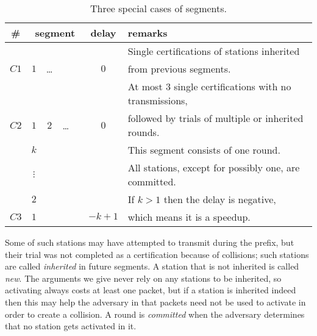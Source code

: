 \documentclass[11pt]{article}
\newcommand{\FF}{\vspace*{\medskipamount}}
\newlength{\pagewidth}
\newcommand{\RB}{\raisebox{2.5ex}{~}}
\newcommand{\LB}{\raisebox{-1.5ex}{~}}
\begin{document}
\begin{table}[tp]
\begin{center}
\begin{tabular}{|c| c  c  c  c | c | l |}
\hline
\RB \LB
 \# & \multicolumn{4}{|c|}{ segment}   & delay & remarks \\
\hline
\hline


\RB \LB
 &  &  &  &  & & 
Single certifications of  stations inherited\\
\LB
$C1$ &\underline{$1$} & \ldots & &   & $0$ & 
from previous segments.\\
\hline

\RB \LB
 &  &  &  & &&   
At most $3$ single certifications with no transmissions, \\
\LB
$C2$ &$1$ & $2$ & \ldots &   & $0$ & 
followed by trials of multiple or inherited rounds.\\
\hline


\RB \LB
 & $k$  & & & &  &   
This segment consists of one round.\\
\RB \LB
 & $\vdots$  & & & &  &   
All stations, except for possibly one, are committed.\\
\RB \LB
 & $2$  & & & &  &   
If $k>1$ then the delay is negative,\\
\RB \LB
$C3$ & \underline{$1$}   & & &  & $-k+1$ & 
which means it is a speedup. \\
\hline

\end{tabular}
\parbox{\pagewidth}{\FF\caption{\label{table-a} 
Three special cases of segments. 
}}
\end{center}
\end{table}



Some of such stations may have attempted to transmit during the prefix, but their trial was not completed as a certification because of collisions; such stations are called \emph{inherited} in future segments.
A station that is not inherited is called \emph{new}.
The arguments we give never rely on any stations to be inherited, so activating always costs at least one packet, but if a station is inherited indeed then this may help the adversary in that packets need not be used to activate in order to create a collision.
A  round is \emph{committed} when the adversary determines that no station gets activated in it.
\end{document}

